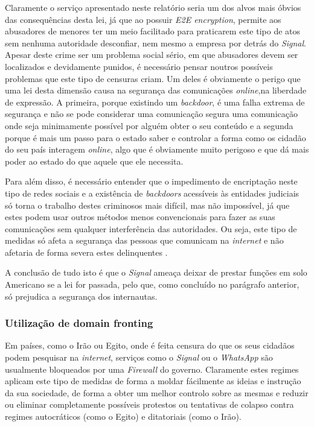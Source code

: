 Claramente o serviço apresentado neste relatório seria um dos alvos mais óbvios das consequências desta lei, já que ao possuir \textit{E2E encryption}, permite aos abusadores de menores ter um meio facilitado para praticarem este tipo de atos sem nenhuma autoridade desconfiar, nem mesmo a empresa por detrás do \textit{Signal}. Apesar deste crime ser um problema social sério, em que abusadores devem ser localizados e devidamente punidos, é necessário pensar noutros possíveis problemas que este tipo de censuras criam. Um deles é obviamente o perigo que uma lei desta dimensão causa na segurança das comunicações \textit{online},na liberdade de expressão. A primeira, porque existindo um \textit{backdoor}, é uma falha extrema de segurança e não se pode considerar uma comunicação segura uma comunicação onde seja minimamente possível por alguém obter o seu conteúdo e a segunda porque é mais um passo para o estado saber e controlar a forma como os cidadão do seu país interagem \textit{online}, algo que é obviamente muito perigoso e que dá mais poder ao estado do que aquele que ele necessita.

Para além disso, é necessário entender que o impedimento de encriptação neste tipo de redes sociais e a existência de \textit{backdoors} acessíveis às entidades judiciais só torna o trabalho destes criminosos mais difícil, mas não impossível, já que estes podem usar outros métodos menos convencionais para fazer as suas comunicações sem qualquer interferência das autoridades. Ou seja, este tipo de medidas só afeta a segurança das pessoas que comunicam na \textit{internet} e não afetaria de forma severa estes delinquentes \cite{sigan_blog_earn_it}.

A conclusão de tudo isto é que o \textit{Signal} ameaça deixar de prestar funções em solo Americano se a lei for passada, pelo que, como concluído no parágrafo anterior, só prejudica a segurança dos internautas.

\subsubsection{Utilização de domain fronting}
Em países, como o Irão ou Egito, onde é feita censura do que os seus cidadãos podem pesquisar na \textit{internet}, serviços como o \textit{Signal} ou o \textit{WhatsApp} são usualmente bloqueados por uma \textit{Firewall} do governo. Claramente estes regimes aplicam este tipo de medidas de forma a moldar fácilmente as ideias e instrução da sua sociedade, de forma a obter um melhor controlo sobre as mesmas e reduzir ou eliminar completamente possíveis protestos ou tentativas de colapso contra regimes autocráticos (como o Egito) e ditatoriais (como o Irão). 

